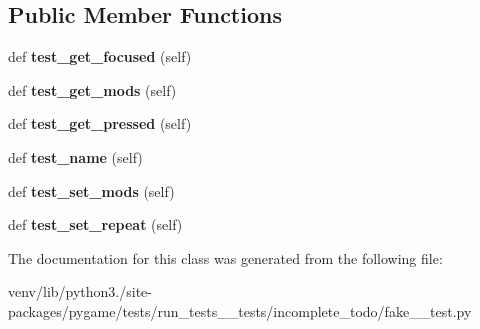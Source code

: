 \subsection*{Public Member Functions}
\begin{DoxyCompactItemize}
\item 
\mbox{\label{classpygame_1_1tests_1_1run__tests____tests_1_1incomplete__todo_1_1fake__3__test_1_1_key_module_test_a3a239d17a37207c593d9c6f36c6ec1f3}} 
def {\bfseries test\+\_\+get\+\_\+focused} (self)
\item 
\mbox{\label{classpygame_1_1tests_1_1run__tests____tests_1_1incomplete__todo_1_1fake__3__test_1_1_key_module_test_a96814b97f5565552fdccbf871fc2e3be}} 
def {\bfseries test\+\_\+get\+\_\+mods} (self)
\item 
\mbox{\label{classpygame_1_1tests_1_1run__tests____tests_1_1incomplete__todo_1_1fake__3__test_1_1_key_module_test_af4e74a74197417c1bf91336f43418560}} 
def {\bfseries test\+\_\+get\+\_\+pressed} (self)
\item 
\mbox{\label{classpygame_1_1tests_1_1run__tests____tests_1_1incomplete__todo_1_1fake__3__test_1_1_key_module_test_aa88da3d2657a34046b8076e8d8c0214e}} 
def {\bfseries test\+\_\+name} (self)
\item 
\mbox{\label{classpygame_1_1tests_1_1run__tests____tests_1_1incomplete__todo_1_1fake__3__test_1_1_key_module_test_a2c7f442a5bb62e5cec047c2f3c0421a1}} 
def {\bfseries test\+\_\+set\+\_\+mods} (self)
\item 
\mbox{\label{classpygame_1_1tests_1_1run__tests____tests_1_1incomplete__todo_1_1fake__3__test_1_1_key_module_test_ae581df2494db82a9972e974323abc068}} 
def {\bfseries test\+\_\+set\+\_\+repeat} (self)
\end{DoxyCompactItemize}


The documentation for this class was generated from the following file\+:\begin{DoxyCompactItemize}
\item 
venv/lib/python3./site-\/packages/pygame/tests/run\+\_\+tests\+\_\+\+\_\+tests/incomplete\+\_\+todo/fake\+\_\+\_\+test.\+py\end{DoxyCompactItemize}
